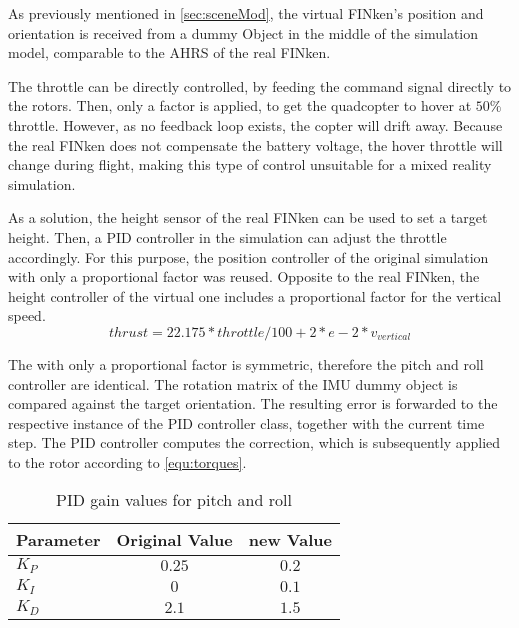 As previously mentioned in \ref{sec:sceneMod}, the virtual FINken's position and orientation is received from a dummy Object in the middle of the simulation model, comparable to the \gls{AHRS} of the real FINken.

The throttle can be directly controlled, by feeding the command signal directly to the rotors. 
Then, only a factor is applied, to get the quadcopter to hover at $50 \%$ throttle. 
However, as no feedback loop exists, the copter will drift away.
Because the real FINken does not compensate the battery voltage, the hover throttle will change during flight, making this type of control unsuitable for a mixed reality simulation.

As a solution, the height sensor of the real FINken can be used to set a target height.
Then, a \gls{PID} controller in the simulation can adjust the throttle accordingly.
For this purpose, the position controller of the original simulation with only a proportional factor was reused. 
Opposite to the real FINken, the height controller of the virtual one includes a proportional factor for the vertical speed.
\begin{equation}
thrust = 22.175 * throttle/100 +2 * e  - 2 *v_{vertical}
\end{equation}


The with only a proportional factor is symmetric, therefore the pitch and roll controller are identical.
The rotation matrix of the \gls{IMU} dummy object is compared against the target orientation.
The resulting error is forwarded to the respective instance of the \gls{PID} controller class, together with the current time step.
The \gls{PID} controller computes the correction, which is subsequently applied to the rotor according to \ref{equ:torques}.

\begin{table}[h]
	\centering
	\begin{tabular}{|l|c|c|}
    		\hline
		Parameter & Original Value & new Value \\
		\hline
    		$K_P$ & $0.25$ &  $0.2$\\
    		\hline
		$K_I$ & $0$ & $0.1$   \\
    		\hline
		$K_D$  & $2.1$ & $1.5$  \\
    		\hline
	\end{tabular}
    	\caption{\gls{PID} gain values for pitch and roll}
      	\label{tab:PIDpitchroll}
\end{table}

